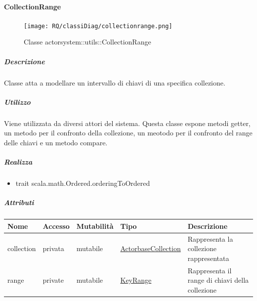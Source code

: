 \documentclass{scalatekids-article}
\begin{document}

\paragraph{CollectionRange}
\label{sec:actorbase::actorsystem::utils::CollectionRange}

\begin{figure}[H]
   \begin{center}
     \texttt{[image: RQ/classiDiag/collectionrange.png]}
     \caption{Classe actorsystem::utils::CollectionRange}
   \end{center}
 \end{figure}

\subparagraph{Descrizione}
Classe atta a modellare un intervallo di chiavi di una specifica collezione.

\subparagraph{Utilizzo}
Viene utilizzata da diversi attori del sistema. Questa classe espone metodi
getter, un metodo per il confronto della collezione, un meotodo per il
confronto del range delle chiavi e un metodo compare.

\subparagraph{Realizza}
\begin{itemize}
\item trait scala.math.Ordered.orderingToOrdered
\end{itemize}

\subparagraph{Attributi}
\begin{tabular}{| p{1.5cm} | p{1.5cm} | p{2cm} | p{3.5cm} | p{8.5cm} |}
  \hline
  Nome & Accesso & Mutabilità & Tipo & Descrizione\\
  \hline
  collection & privata & mutabile & \hyperref[sec:actorbase::actorsystem::utils::ActorbaseCollection]{ActorbaseCollection} & Rappresenta la collezione rappresentata \\
  \hline
  range & private & mutabile & \hyperref[sec:actorbase::actorsystem::utils::KeyRange]{KeyRange} & Rappresenta il range di chiavi della collezione \\
  \hline
\end{tabular}
\end{document}
